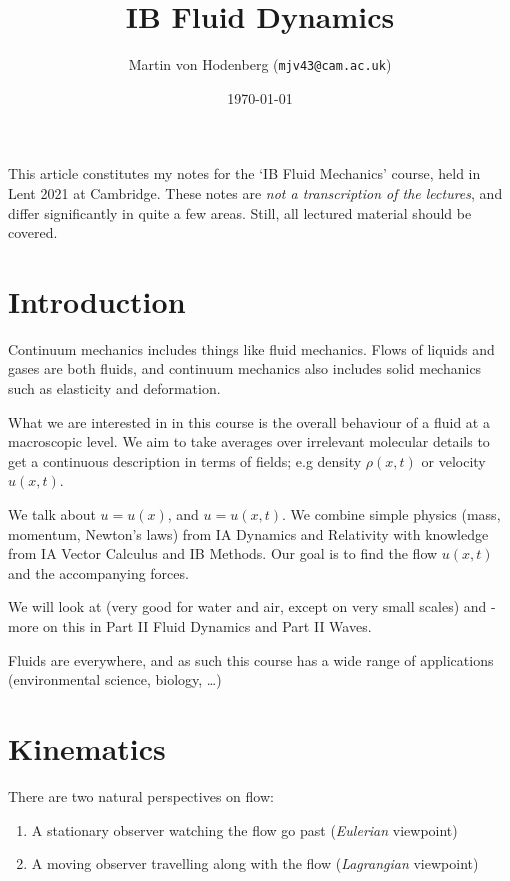 \documentclass[a4paper]{scrartcl}
\title{IB Fluid Dynamics}
\author{Martin von Hodenberg (\texttt{mjv43@cam.ac.uk})}
\date{\today}
\begin{document}
\maketitle


This article constitutes my notes for the `IB Fluid Mechanics' course, held in Lent 2021 at Cambridge. These notes are \emph{not a transcription of the lectures}, and differ significantly in quite a few areas. Still, all lectured material should be covered.



\tableofcontents
\newpage
\section{Introduction}
Continuum mechanics includes things like fluid mechanics. Flows of liquids and gases are both fluids, and continuum mechanics also includes solid mechanics such as elasticity and deformation. 

What we are interested in in this course is the overall behaviour of a fluid at a macroscopic level. We aim to take averages over irrelevant molecular details to get a continuous description in terms of fields; e.g density $\rho (x,t)$ or velocity $u (x,t)$.

We talk about  $u=u (x)$, and  $u=u (x,t)$. We combine simple physics (mass, momentum, Newton's laws) from IA Dynamics and Relativity with knowledge from IA Vector Calculus and IB Methods. Our goal is to find the flow $u (x,t)$ and the accompanying forces. 

We will look at  (very good for water and air, except on very small scales) and  - more on this in Part II Fluid Dynamics and Part II Waves.

Fluids are everywhere, and as such this course has a wide range of applications (environmental science, biology, \ldots)

\section{Kinematics}
There are two natural perspectives on flow:
\begin{enumerate}
    \item A stationary observer watching the flow go past (\emph{Eulerian} viewpoint)
    \item A moving observer travelling along with the flow (\emph{Lagrangian} viewpoint)
\end{enumerate}
\end{document}
